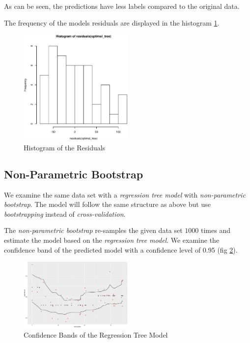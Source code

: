 \documentclass[a4paper, twocolumn]{article}
\begin{document}
        As can be seen, the predictions have less labels compared to the original data.

        The frequency of the models residuals are displayed in the histogram \ref{fig:residuals}.

        \begin{figure}[h!]
            \centering
            \caption{Histogram of the Residuals}
            \label{fig:residuals}
            \includegraphics[width=0.5\textwidth]{share/A1_historgram_residuals.eps}
        \end{figure}

    \subsection*{Non-Parametric Bootstrap}

        We examine the same data set with a \emph{regression tree model} with \emph{non-parametric bootstrap}. The model will follow the same structure as above but use \emph{bootstrapping} instead of \emph{cross-validation}.

        The \emph{non-parametric bootstrap} re-samples the given data set $1000$ times and estimate the model based on the \emph{regression tree model}. We examine the confidence band of the predicted model with a confidence level of 0.95 (fig \ref{fig:confidence_bands}).

        \begin{figure}[h!]
            \centering
            \caption{Confidence Bands of the Regression Tree Model}
            \label{fig:confidence_bands}
            \includegraphics[width=0.5\textwidth]{share/A1_nonparametric.eps}
        \end{figure}
\end{document}
